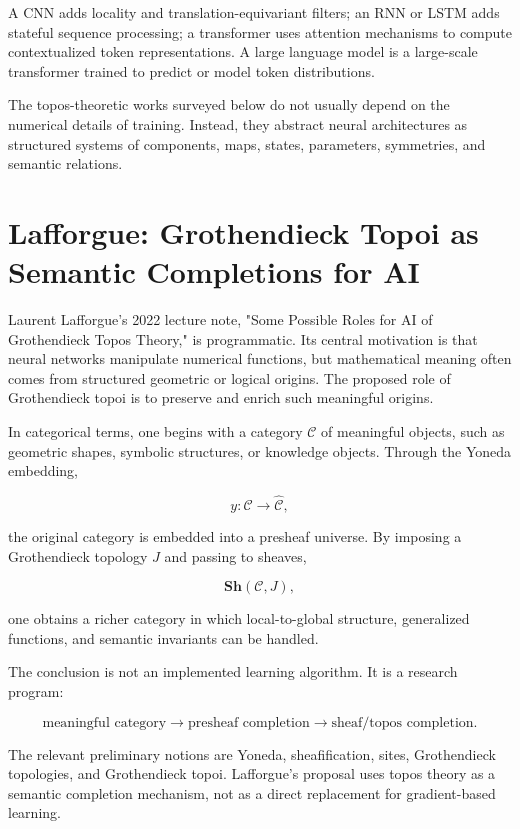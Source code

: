 \documentclass[11pt]{article}
\begin{document}
A CNN adds locality and translation-equivariant filters; an RNN or LSTM adds stateful sequence processing; a transformer uses attention mechanisms to compute contextualized token representations. A large language model is a large-scale transformer trained to predict or model token distributions.


The topos-theoretic works surveyed below do not usually depend on the numerical details of training. Instead, they abstract neural architectures as structured systems of components, maps, states, parameters, symmetries, and semantic relations.


\section{Lafforgue: Grothendieck Topoi as Semantic Completions for AI}

Laurent Lafforgue's 2022 lecture note, "Some Possible Roles for AI of Grothendieck Topos Theory," is programmatic. Its central motivation is that neural networks manipulate numerical functions, but mathematical meaning often comes from structured geometric or logical origins. The proposed role of Grothendieck topoi is to preserve and enrich such meaningful origins.


In categorical terms, one begins with a category \(\mathcal{C}\) of meaningful objects, such as geometric shapes, symbolic structures, or knowledge objects. Through the Yoneda embedding,


\[
y:\mathcal{C}\to\widehat{\mathcal{C}},
\]

the original category is embedded into a presheaf universe. By imposing a Grothendieck topology \(J\) and passing to sheaves,


\[
\mathbf{Sh}(\mathcal{C},J),
\]

one obtains a richer category in which local-to-global structure, generalized functions, and semantic invariants can be handled.


The conclusion is not an implemented learning algorithm. It is a research program:


\[
\text{meaningful category}
\longrightarrow
\text{presheaf completion}
\longrightarrow
\text{sheaf/topos completion}.
\]

The relevant preliminary notions are Yoneda, sheafification, sites, Grothendieck topologies, and Grothendieck topoi. Lafforgue's proposal uses topos theory as a semantic completion mechanism, not as a direct replacement for gradient-based learning.
\end{document}
